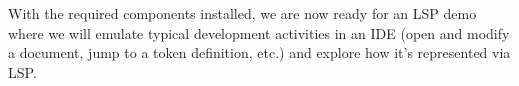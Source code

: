 With the required components installed, we are now ready for an LSP demo where we will emulate typical development activities in an IDE (open and modify a document, jump to a token definition, etc.) and explore how it’s represented via LSP.










































































